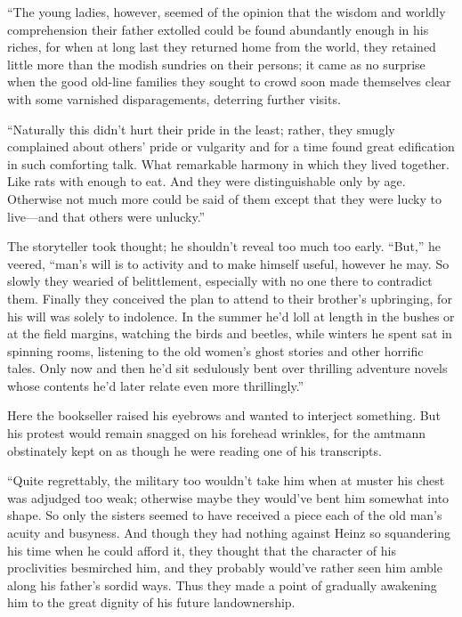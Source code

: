 \documentclass[12pt,a4paper]{article}
\begin{document}
“The young ladies, however, seemed of the opinion that the wisdom and worldly comprehension their father extolled could be found abundantly enough in his riches, for when at long last they returned home from the world, they retained little more than the modish sundries on their persons; it came as no surprise when the good old-line families they sought to crowd soon made themselves clear with some varnished disparagements, deterring further visits.

“Naturally this didn’t hurt their pride in the least; rather, they smugly complained about others’ pride or vulgarity and for a time found great edification in such comforting talk. What remarkable harmony in which they lived together. Like rats with enough to eat. And they were distinguishable only by age. Otherwise not much more could be said of them except that they were lucky to live—and that others were unlucky.”

The storyteller took thought; he shouldn’t reveal too much too early. “But,” he veered, “man’s will is to activity and to make himself useful, however he may. So slowly they wearied of belittlement, especially with no one  there to contradict them. Finally they conceived the plan to attend to their brother’s upbringing, for his will was solely to indolence. In the summer he’d loll at length in the bushes or at the field margins, watching the birds and beetles, while winters he spent sat in spinning rooms, listening to the old women’s ghost stories and other horrific tales. Only now and then he’d sit sedulously bent over thrilling adventure novels whose contents he’d later relate even more thrillingly.”

Here the bookseller raised his eyebrows and wanted to interject something. But his protest would remain snagged on his forehead wrinkles, for the amtmann obstinately kept on as though he were reading one of his transcripts.

“Quite regrettably, the military too wouldn’t take him when at muster his chest was adjudged too weak; otherwise maybe they would’ve bent him somewhat into shape. So only the sisters seemed to have received a piece each of the old man’s acuity and busyness. And though they had nothing against Heinz so squandering his time when he could afford it, they thought that the character of his proclivities besmirched him, and they probably would’ve rather seen him amble along his father’s sordid ways. Thus they made a point of gradually awakening him to the great dignity of his future landownership.
\end{document}
